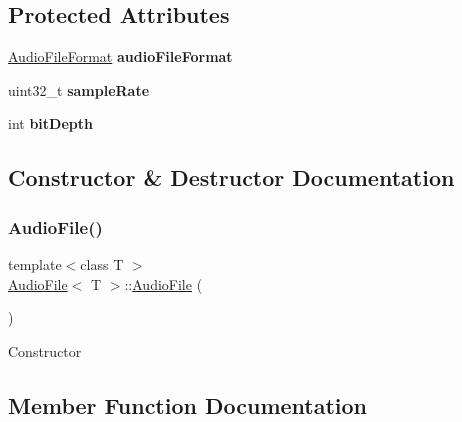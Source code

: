 \subsection*{Protected Attributes}
\begin{DoxyCompactItemize}
\item 
\mbox{\label{class_audio_file_aeafbb547cc9b08418212c41215c57838}} 
\hyperlink{_audio_file_8h_ad18559d169602e85d0ad68da6ef8593f}{Audio\+File\+Format} {\bfseries audio\+File\+Format}
\item 
\mbox{\label{class_audio_file_aa8517ad3c63493253ecf59bb0c9974c1}} 
uint32\+\_\+t {\bfseries sample\+Rate}
\item 
\mbox{\label{class_audio_file_a19f9bc02bc118b7c2fa3d50e7bbb49b3}} 
int {\bfseries bit\+Depth}
\end{DoxyCompactItemize}


\subsection{Constructor \& Destructor Documentation}
\mbox{\label{class_audio_file_ae74399e93d3f4623c7421ee10cfc0e15}} 
\subsubsection{\texorpdfstring{Audio\+File()}{AudioFile()}}
{\footnotesize\ttfamily template$<$class T $>$ \\
\hyperlink{class_audio_file}{Audio\+File}$<$ T $>$\+::\hyperlink{class_audio_file}{Audio\+File} (\begin{DoxyParamCaption}{ }\end{DoxyParamCaption})}

Constructor 

\subsection{Member Function Documentation}
\mbox{\label{class_audio_file_a5495d5cb55911de54f0714e219130b48}} 
